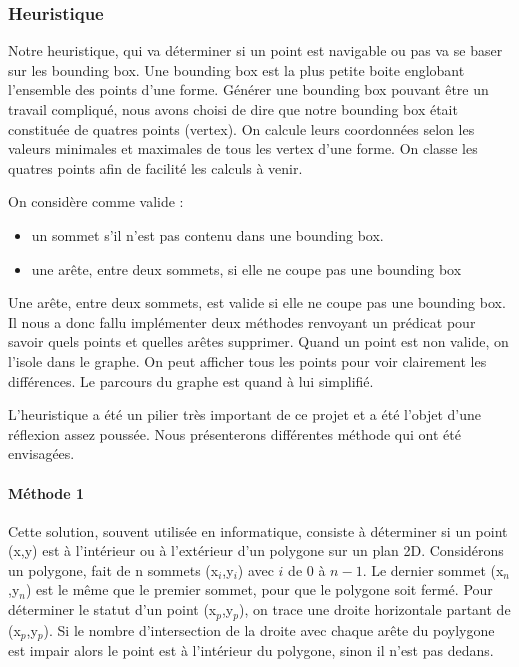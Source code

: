 \documentclass[a4paper,12pt]{report}
\begin{document}
\subsubsection{Heuristique}

Notre heuristique, qui va déterminer si un point est navigable ou pas va se baser sur les bounding box. Une bounding box est la plus petite boite englobant l'ensemble des points d'une forme. Générer une bounding box pouvant être un travail compliqué, nous avons choisi de dire que notre bounding box était constituée de quatres points (vertex). On calcule leurs coordonnées selon les valeurs minimales et maximales de tous les vertex d'une forme. On classe les quatres points afin de facilité les calculs à venir.

On considère comme valide :
\begin{itemize}
 \item un sommet s'il n'est pas contenu dans une bounding box. 
 \item une arête, entre deux sommets, si elle ne coupe pas une bounding box
\end{itemize}

Une arête, entre deux sommets, est valide si elle ne coupe pas une bounding box. Il nous a donc fallu implémenter deux méthodes renvoyant un prédicat pour savoir quels points et quelles arêtes supprimer. 
Quand un point est non valide, on l'isole dans le graphe. On peut afficher tous les points pour voir clairement les différences. Le parcours du graphe est quand à lui simplifié.

L'heuristique a été un pilier très important de ce projet et a été l'objet d'une réflexion assez poussée. Nous présenterons différentes méthode qui ont été envisagées.

\paragraph{Méthode 1 }
Cette solution, souvent utilisée en informatique, consiste à déterminer si un point (x,y) est à l'intérieur ou à l'extérieur d'un
polygone sur un plan 2D. 
Considérons un polygone, fait de n sommets (x$_{i}$,y$_{i}$) avec $i$ de $0$ à $n-1$. Le dernier sommet (x$_{n}$,y$_{n}$) est le même que le premier sommet, pour que le polygone soit fermé. 
Pour déterminer le statut d'un point (x$_{p}$,y$_{p}$), on trace une droite horizontale partant de (x$_{p}$,y$_{p}$). 
Si le nombre d'intersection de la droite avec chaque arête du poylygone est impair alors le point est à l'intérieur du polygone, sinon il n'est pas dedans.
\end{document}
